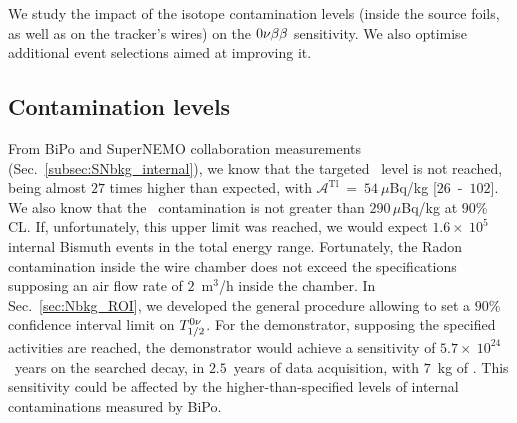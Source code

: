 We study the impact of the isotope contamination levels (inside the source foils, as well as on the tracker's wires) on the $0\nu\beta\beta$ sensitivity.
We also optimise additional event selections aimed at improving it.


\subsection{Contamination levels}
\label{subsec:Influence_cont}

From BiPo  and SuperNEMO collaboration measurements (Sec.~\ref{subsec:SNbkg_internal}), we know that the targeted \Tl\ level is not reached, being almost $27$ times higher than expected, with $\mathcal{A}^{\text{Tl}}~=~54~\mu$Bq/kg [$26$~-~$102$].
We also know that the \Bi\ contamination is not greater than $290\,\mu$Bq/kg at $90$\% CL.
If, unfortunately, this upper limit was reached, we would expect $1.6\times~10^{5}$ internal Bismuth events in the total energy range.
Fortunately, the Radon contamination inside the wire chamber does not exceed the specifications supposing an air flow  rate of $2$~m$^{3}$/h inside the chamber.
In Sec.~\ref{sec:Nbkg_ROI}, we developed the general procedure allowing to set a $90\%$ confidence interval limit on $T_{1/2}^{0\nu}$.
For the demonstrator, supposing the specified activities are reached, the demonstrator would achieve a sensitivity of $5.7\times~10^{24}$~years on the searched decay, in $2.5$~years of data acquisition, with $7$~kg of \Se.
This sensitivity could be affected by the higher-than-specified levels of internal contaminations measured by BiPo.

